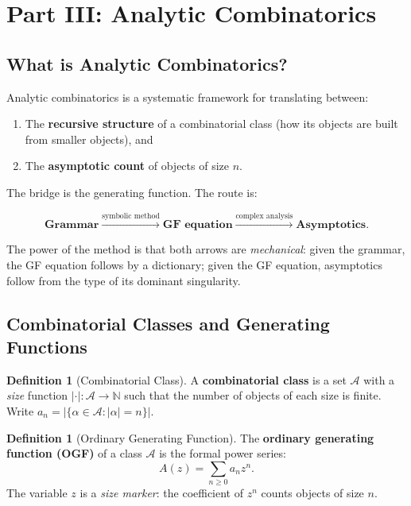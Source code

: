 \documentclass[11pt,a4paper]{article}
\theoremstyle{definition}
\newtheorem{definition}[theorem]{Definition}
\newcommand{\N}{\mathbb{N}}
\begin{document}
\clearpage

\section{Part III: Analytic Combinatorics}
\label{sec:ac}

\subsection{What is Analytic Combinatorics?}

Analytic combinatorics \cite{flajolet2009} is a systematic framework for translating
between:

\begin{enumerate}[leftmargin=2em]
  \item The \textbf{recursive structure} of a combinatorial class (how its objects
        are built from smaller objects), and
  \item The \textbf{asymptotic count} of objects of size $n$.
\end{enumerate}

The bridge is the generating function. The route is:

\[
  \textbf{Grammar} \xrightarrow{\text{symbolic method}}
  \textbf{GF equation} \xrightarrow{\text{complex analysis}}
  \textbf{Asymptotics.}
\]

The power of the method is that both arrows are \emph{mechanical}: given the
grammar, the GF equation follows by a dictionary; given the GF equation, asymptotics
follow from the type of its dominant singularity.

\subsection{Combinatorial Classes and Generating Functions}

\begin{definition}[Combinatorial Class]
A \textbf{combinatorial class} is a set $\mathcal{A}$ with a \emph{size} function
$|\cdot|: \mathcal{A} \to \N$ such that the number of objects of each size is
finite. Write $a_n = |\{\alpha \in \mathcal{A} : |\alpha| = n\}|$.
\end{definition}

\begin{definition}[Ordinary Generating Function]
The \textbf{ordinary generating function (OGF)} of a class $\mathcal{A}$ is the
formal power series:
\begin{equation}
  A(z) = \sum_{n \geq 0} a_n z^n.
  \label{eq:ogf}
\end{equation}
The variable $z$ is a \emph{size marker}: the coefficient of $z^n$ counts objects
of size $n$.
\end{definition}
\end{document}
